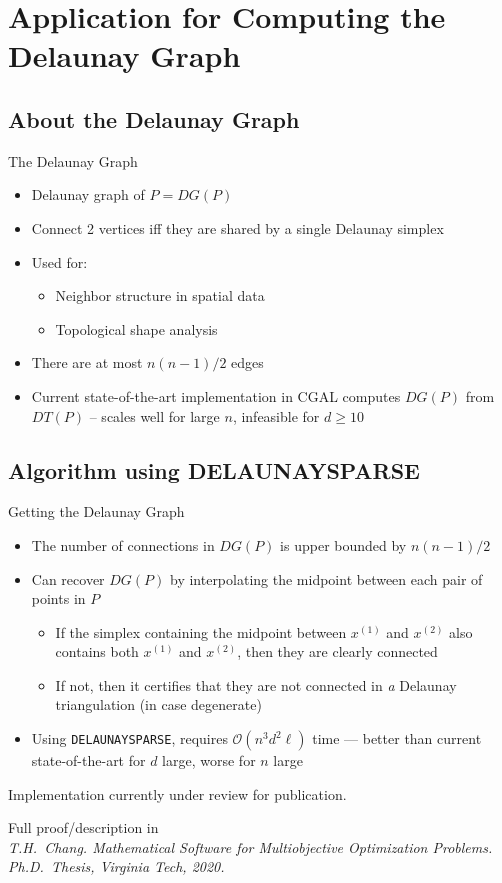 \documentclass[aspectratio=169]{beamer}
\begin{document}
\section{Application for Computing the Delaunay Graph}
\subsection{About the Delaunay Graph}
\begin{frame}{The Delaunay Graph}
\begin{itemize}
\item Delaunay graph of $P = DG(P)$
\item Connect 2 vertices iff they are shared by a single Delaunay simplex
\item Used for:
\begin{itemize}
\item Neighbor structure in spatial data
\item Topological shape analysis
\end{itemize}
\item There are at most $n(n-1)/2$ edges
\item Current state-of-the-art implementation in CGAL computes $DG(P)$ from
$DT(P)$ -- scales well for large $n$, infeasible for $d\geq10$
\end{itemize}
\end{frame}

\subsection{Algorithm using DELAUNAYSPARSE}
\begin{frame}{Getting the Delaunay Graph}
\begin{itemize}
\item The number of connections in $DG(P)$ is upper bounded by $n(n-1)/2$
\item Can recover $DG(P)$ by interpolating the midpoint between each
pair of points in $P$
\begin{itemize}
\item If the simplex containing the midpoint between $x^{(1)}$ and $x^{(2)}$
also contains both $x^{(1)}$ and $x^{(2)}$, then they are clearly connected
\item If not, then it certifies that they are not connected in {\it a}
Delaunay triangulation (in case degenerate)
\end{itemize}
\item Using {\tt DELAUNAYSPARSE}, requires
$\mathcal{O}(n^3 d^2 \ell)$ time --- better than current state-of-the-art for
$d$ large, worse for $n$ large
\end{itemize}

\medskip
Implementation currently under review for publication.

\medskip
Full proof/description in\\
{\tiny \it T.H.~Chang. Mathematical Software for Multiobjective Optimization
Problems. Ph.D.~Thesis, Virginia Tech, 2020.}
\end{frame}
\end{document}
